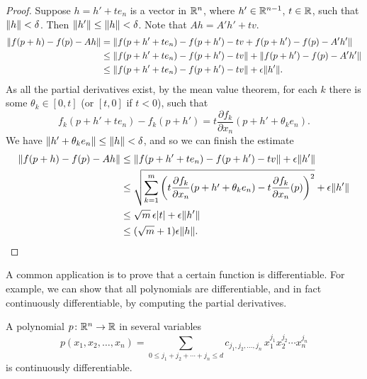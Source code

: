 \begin{proof}
Suppose $h = h' + t e_n$ is a vector in ${\mathbb{R}}^n$, where $h' \in {\mathbb{R}}^{n-1}$,
$t \in {\mathbb{R}}$, such that
$\lVert {h} \rVert < \delta$.  Then $\lVert {h'} \rVert \leq \lVert {h} \rVert < \delta$.
Note that $Ah = A' h' + tv$.
\begin{equation*}
\begin{split}
\lVert {f(p+h) - f(p) - Ah} \rVert
& = \lVert {f(p+h' + t e_n) - f(p+h') - tv + f(p+h') - f(p) - A' h'} \rVert
\\
& \leq \lVert {f(p+h' + t e_n) - f(p+h') -tv} \rVert + \lVert {f(p+h') - f(p) -
A' h'} \rVert
\\
& \leq \lVert {f(p+h' + t e_n) - f(p+h') -tv} \rVert + \epsilon \lVert {h'} \rVert .
\end{split}
\end{equation*}
As all the partial derivatives exist, by the mean value theorem,
for each $k$ there is some $\theta_k \in [0,t]$ (or $[t,0]$ if $t < 0$), such that
\begin{equation*}
f_k(p+h' + t e_n) - f_k(p+h') =
t \frac{\partial f_k}{\partial x_n}(p+h'+\theta_k e_n).
\end{equation*}
We have $\lVert {h'+\theta_k e_n} \rVert \leq \lVert {h} \rVert < \delta$,
and so we can finish the estimate
\begin{equation*}
\begin{split}
\lVert {f(p+h) - f(p) - Ah} \rVert
& \leq \lVert {f(p+h' + t e_n) - f(p+h') -tv} \rVert + \epsilon \lVert {h'} \rVert
\\
& \leq \sqrt{\sum_{k=1}^m {\left(t\frac{\partial f_k}{\partial x_n}(p+h'+\theta_k e_n) -
t \frac{\partial f_k}{\partial x_n}(p)\right)}^2} + \epsilon \lVert {h'} \rVert
\\
& \leq \sqrt{m}\, \epsilon \lvert {t} \rvert + \epsilon \lVert {h'} \rVert
\\
& \leq (\sqrt{m}+1)\epsilon \lVert {h} \rVert . \qedhere
\end{split}
\end{equation*}
\end{proof}

A common application is to prove that a certain function is
differentiable.  For example, we can show that all polynomials
are differentiable, and in fact continuously differentiable,
by computing the partial derivatives.

\begin{cor}
A polynomial $p \colon {\mathbb{R}}^n \to {\mathbb{R}}$ in several variables
\begin{equation*}
p(x_1,x_2,\ldots,x_n)
=
\sum_{0 \leq j_1+j_2+\cdots+j_n \leq d}
c_{j_1,j_2,\ldots,j_n}
\,
x_1^{j_1}
x_2^{j_2}
\cdots
x_n^{j_n}
\end{equation*}
is continuously differentiable.
\end{cor}

